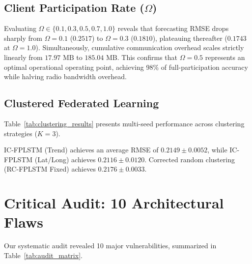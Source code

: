\documentclass[10pt,journal,compsoc,twocolumn]{article}
\begin{document}
\subsection{Client Participation Rate ($\Omega$)}
Evaluating $\Omega \in \{0.1, 0.3, 0.5, 0.7, 1.0\}$ reveals that forecasting RMSE drops sharply from $\Omega=0.1$ ($0.2517$) to $\Omega=0.3$ ($0.1810$), plateauing thereafter ($0.1743$ at $\Omega=1.0$). Simultaneously, cumulative communication overhead scales strictly linearly from $17.97\text{ MB}$ to $185.04\text{ MB}$. This confirms that $\Omega = 0.5$ represents an optimal operational operating point, achieving 98\% of full-participation accuracy while halving radio bandwidth overhead.

\subsection{Clustered Federated Learning}
Table~\ref{tab:clustering_results} presents multi-seed performance across clustering strategies ($K=3$).



IC-FPLSTM (Trend) achieves an average RMSE of $0.2149 \pm 0.0052$, while IC-FPLSTM (Lat/Long) achieves $0.2116 \pm 0.0120$. Corrected random clustering (RC-FPLSTM Fixed) achieves $0.2176 \pm 0.0033$. 

\section{Critical Audit: 10 Architectural Flaws}
\label{sec:critique}
Our systematic audit revealed 10 major vulnerabilities, summarized in Table~\ref{tab:audit_matrix}.
\end{document}
